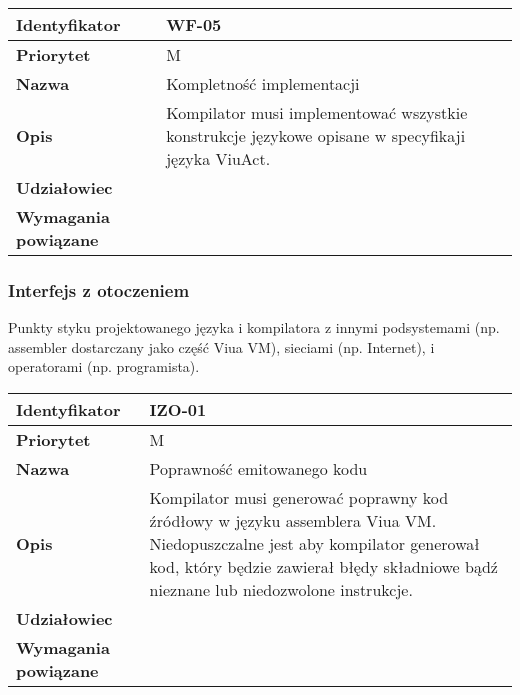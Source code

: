 \vspace{1em}

\begin{tabular}{ | l | l | }
    \hline
    \textbf{Identyfikator} & \parbox[t]{11cm}{WF-05} \\
    \hline
    \textbf{Priorytet} & M \\
    \hline
    \textbf{Nazwa} & Kompletność implementacji \\
    \hline
    \textbf{Opis} & \parbox[t]{11cm}{
        Kompilator musi implementować wszystkie konstrukcje językowe opisane w specyfikaji języka
        ViuAct.
    } \\
    \hline
    \textbf{Udziałowiec} & \phantom{} \\
    \hline
    \textbf{Wymagania powiązane} & \phantom{} \\
    \hline
\end{tabular}

\subsubsection{Interfejs z otoczeniem}

Punkty styku projektowanego języka i kompilatora z innymi podsystemami (np. assembler dostarczany jako
część Viua VM), sieciami (np. Internet), i operatorami (np. programista).

\vspace{1em}

\begin{tabular}{ | l | l | }
    \hline
    \textbf{Identyfikator} & \parbox[t]{11cm}{IZO-01} \\
    \hline
    \textbf{Priorytet} & M \\
    \hline
    \textbf{Nazwa} & Poprawność emitowanego kodu \\
    \hline
    \textbf{Opis} & \parbox[t]{11cm}{
        Kompilator musi generować poprawny kod źródłowy w języku assemblera Viua VM.
        Niedopuszczalne jest aby kompilator generował kod, który będzie zawierał błędy składniowe bądź
        nieznane lub niedozwolone instrukcje.
    } \\
    \hline
    \textbf{Udziałowiec} & \phantom{} \\
    \hline
    \textbf{Wymagania powiązane} & \phantom{} \\
    \hline
\end{tabular}

\vspace{1em}

